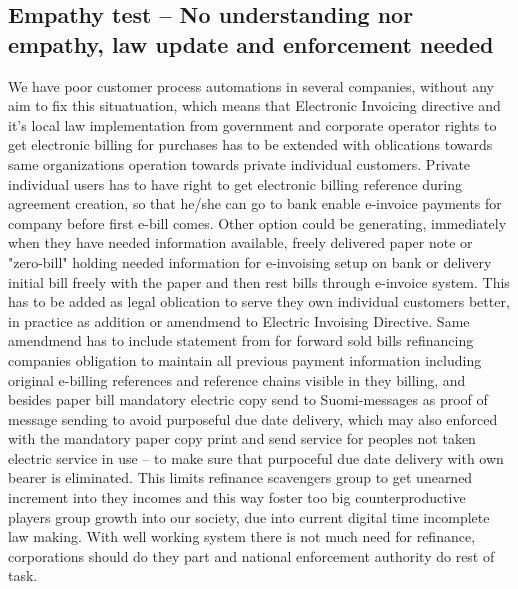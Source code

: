 \subsection{Empathy test -- No understanding
nor empathy, law update and enforcement needed}
\label{Empathy_test_fail_law_needed}

We have poor customer process automations in several companies, without any
aim to fix this situatuation, which means that Electronic Invoicing
directive\allowbreak\cite{EULEX_2014_55} and it's local law
imp\-le\-men\-ta\-tion\allowbreak\cite{LEX_2019_241} from government and
corporate operator rights to get electronic billing for purchases has to be
extended with oblications towards same organizations operation towards private
individual customers. Private individual users has to have right to get
electronic billing reference during agreement creation, so that he/she can go
to bank enable e-invoice payments for company before first e-bill comes. Other
option could be generating, immediately when they have needed information
available, freely delivered paper note or "zero-bill" holding needed
information for e-invoising setup on bank or delivery initial bill freely with
the paper and then rest bills through e-invoice system. This has to be added
as legal oblication to serve they own individual customers better, in practice
as addition or amendmend to Electric Invoising Directive\allowbreak\cite{
EULEX_2014_55}. Same amendmend has to include statement from for forward sold
bills refinancing companies obligation to maintain all previous payment
information including original e-billing references and reference chains
visible in they billing, and besides paper bill mandatory electric copy send
to Suomi-messages \cite{VM006_00_2024} as proof of message sending to avoid
purposeful due date delivery, which may also enforced with the mandatory paper
copy print and send service for peoples not taken electric service in use --
to make sure that purpoceful due date delivery with own bearer is eliminated.
This limits refinance scavengers group
to get unearned increment into they incomes and this way foster too big
counterproductive players group growth into our society, due into current
digital time incomplete law making. With well working system there is not much
need for refinance, corporations should do they part and national enforcement
authority \cite{NationalEnforcementAuthorityFinland} do rest of task.

